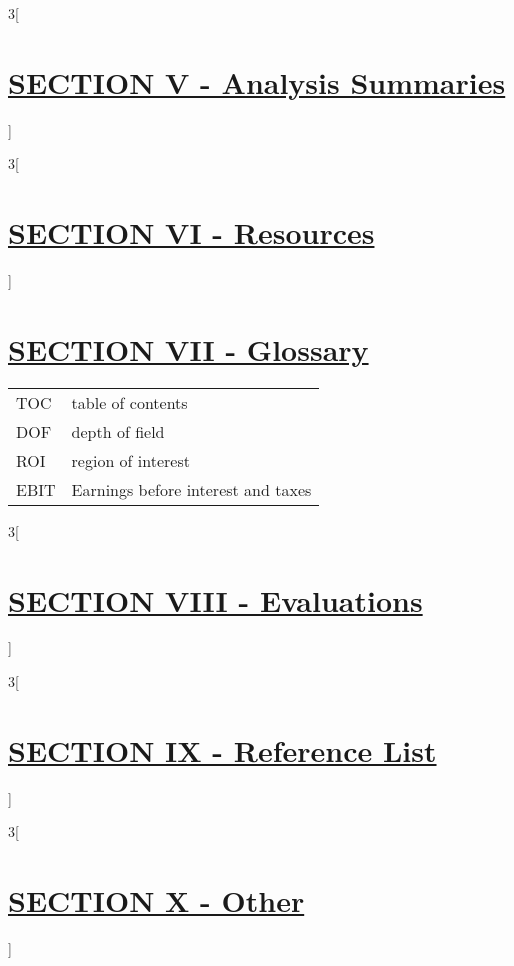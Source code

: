 \documentclass[11pt,a4paper,numbers=noenddot]{scrartcl}
\begin{document}
\newpage
\begin{paracol}{3}[\section{\underline{SECTION V - Analysis Summaries}}]
	
\end{paracol}

\newpage
\begin{paracol}{3}[\section{\underline{SECTION VI - Resources}}]
	
\end{paracol}

\newpage
\section{\underline{SECTION VII - Glossary}}
\begin{tabularx}{\textwidth}{p{3cm} l}
	TOC & table of contents \\
	DOF & depth of field \\
	ROI & region of interest \\
	EBIT & Earnings before interest and taxes
\end{tabularx}	
	
\newpage
\begin{paracol}{3}[\section{\underline{SECTION VIII - Evaluations}}]
	
\end{paracol}

\newpage
\begin{paracol}{3}[\section{\underline{SECTION IX - Reference List}}]
	
\end{paracol}
\printbibliography

\newpage
\begin{paracol}{3}[\section{\underline{SECTION X - Other}}]
	
\end{paracol}
\end{document}
